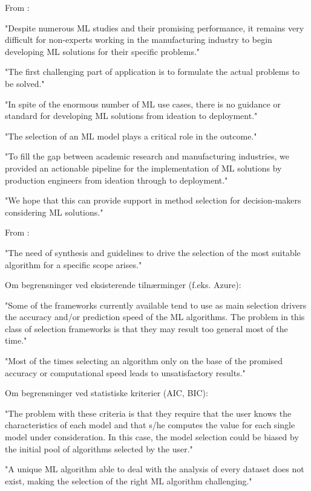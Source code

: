 From \parencite{chen2023ml_manufacturing_industry4} :

"Despite numerous ML studies and their promising performance, it remains very difficult for non-experts working in the manufacturing industry to begin developing ML solutions for their specific problems."


"The first challenging part of application is to formulate the actual problems to be solved."


"In spite of the enormous number of ML use cases, there is no guidance or standard for developing ML solutions from ideation to deployment."


"The selection of an ML model plays a critical role in the outcome."


"To fill the gap between academic research and manufacturing industries, we provided an actionable pipeline for the implementation of ML solutions by production engineers from ideation through to deployment."


"We hope that this can provide support in method selection for decision-makers considering ML solutions."

From \parencite{sala2018selecting_ml_algorithm} :

"The need of synthesis and guidelines to drive the selection of the most suitable algorithm for a specific scope arises."

Om begrensninger ved eksisterende tilnærminger (f.eks. Azure):

"Some of the frameworks currently available tend to use as main selection drivers the accuracy and/or prediction speed of the ML algorithms. The problem in this class of selection frameworks is that they may result too general most of the time."

"Most of the times selecting an algorithm only on the base of the promised accuracy or computational speed leads to unsatisfactory results."

Om begrensninger ved statistiske kriterier (AIC, BIC):

"The problem with these criteria is that they require that the user knows the characteristics of each model and that s/he computes the value for each single model under consideration. In this case, the model selection could be biased by the initial pool of algorithms selected by the user."

"A unique ML algorithm able to deal with the analysis of every dataset does not exist, making the selection of the right ML algorithm challenging."

